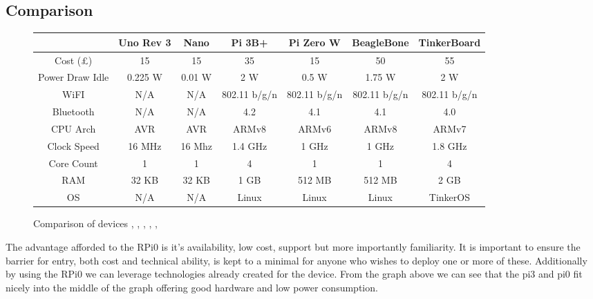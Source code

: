 \subsection{Comparison}
\begin{figure}[H]
	\hspace{-2cm}
	\begin{tabular}{ccccccc}
		\hline 
		{} & Uno Rev 3 & Nano & Pi 3B+ & Pi Zero W & BeagleBone & TinkerBoard \\ 
		\hline 
		Cost (£) & 15 & 15 & 35 & 15 & 50 & 55 \\ 
		Power Draw Idle & 0.225 W & 0.01 W & 2 W & 0.5 W & 1.75 W & 2 W  \\ 
		WiFI & N/A & N/A & 802.11 b/g/n & 802.11 b/g/n & 802.11 b/g/n & 802.11 b/g/n \\ 
		Bluetooth & N/A & N/A & 4.2 & 4.1 & 4.1 & 4.0 \\ 
		CPU Arch & AVR & AVR & ARMv8 & ARMv6 & ARMv8 & ARMv7 \\ 
		Clock Speed & 16 MHz & 16 Mhz & 1.4 GHz & 1 GHz & 1 GHz & 1.8 GHz \\ 
		Core Count & 1 & 1 & 4 & 1 & 1 & 4 \\ 
		RAM & 32 KB & 32 KB & 1 GB & 512 MB & 512 MB & 2 GB \\ 
		OS & N/A & N/A & Linux & Linux & Linux & TinkerOS \\
		\hline 
	\end{tabular}
	\caption{ Comparison of devices \citep{ArduinoLLC2010}, \citep{ArduinoLLC2008a}, \citep{RaspberryPiFoundation2018}, \citep{RaspberryPiFoundation2017}, \citep{BeagleBoard2017}, \citep{Asus2017}}
	\label{fig:devicecompare}
\end{figure}

The advantage afforded to the RPi0 is it’s availability, low cost, support but more importantly familiarity. It is important to ensure the barrier for entry, both cost and technical ability, is kept to a minimal for anyone who wishes to deploy one or more of these. Additionally by using the RPi0 we can leverage technologies already created for the device. 
From the graph above we can see that the pi3 and pi0 fit nicely into the middle of the graph offering good hardware and low power consumption. 